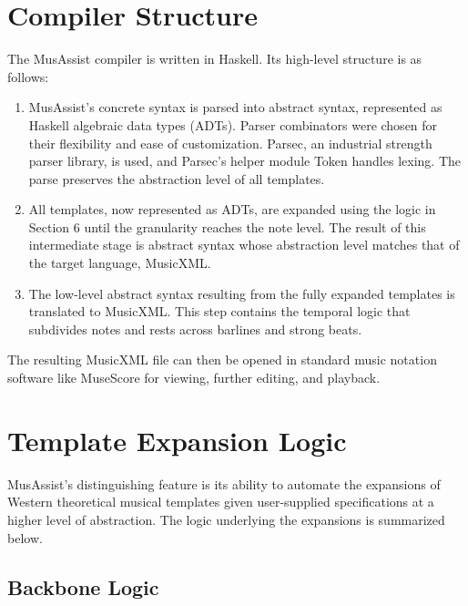 \documentclass{article}
\begin{document}
\section{Compiler Structure}\label{sec:compiler_structure}

The MusAssist compiler is written in Haskell. Its high-level structure is as follows: 

\begin{enumerate}
\itemsep0pt 
  \item MusAssist’s concrete syntax is parsed into abstract syntax, represented as Haskell algebraic data types (ADTs). Parser combinators were chosen for their flexibility and ease of customization. Parsec, an industrial strength parser library, is used, and Parsec’s helper module Token handles lexing. The parse preserves the abstraction level of all templates.

  \item All templates, now represented as ADTs, are expanded using the logic in Section 6 until the granularity reaches the note level. The result of this intermediate stage is abstract syntax whose abstraction level matches that of the target language, MusicXML.

  \item The low-level abstract syntax resulting from the fully expanded templates is translated to MusicXML. This step contains the temporal logic that subdivides notes and rests across barlines and strong beats.
  
\end{enumerate}

The resulting MusicXML file can then be opened in standard music notation software like MuseScore for viewing, further editing, and playback.


\section{Template Expansion Logic}\label{sec:template_expansions}
MusAssist’s distinguishing feature is its ability to automate the expansions of Western theoretical musical templates given user-supplied specifications at a higher level of abstraction. The logic underlying the expansions is summarized below. 

\subsection{Backbone Logic}
\end{document}
